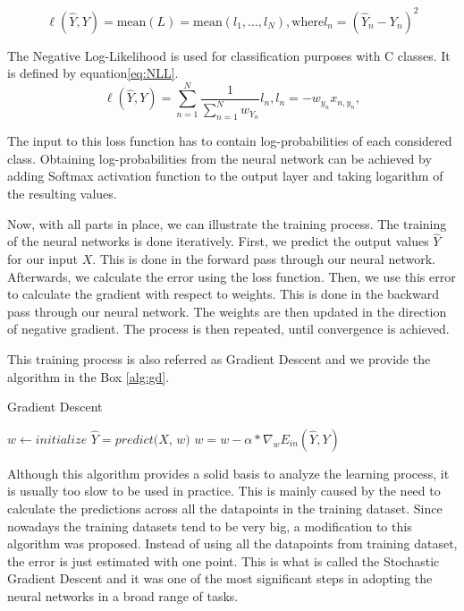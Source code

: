 \begin{equation}
    \ell(\hat{Y}, Y) = \text{mean}(L) = \text{mean}(l_1,\dots,l_N), 
    \text{where} l_n = (\hat{Y}_n - Y_n)^2
    \label{eq:MSE}
\end{equation}

The Negative Log-Likelihood is used for classification purposes with C classes.
It is defined by equation\ref{eq:NLL}.
\begin{equation}
    \ell(\hat{Y}, Y) = \sum_{n=1}^N \frac{1}{\sum_{n=1}^N w_{Y_n}} l_n,
    l_n = - w_{y_n} x_{n,y_n},
    \label{eq:NLL}
\end{equation}

The input to this loss function has to contain log-probabilities of each considered class.
Obtaining log-probabilities from the neural network can be achieved by adding Softmax activation function to the output layer and taking logarithm of the resulting values.

Now, with all parts in place, we can illustrate the training process.
The training of the neural networks is done iteratively.
First, we predict the output values $\hat{Y}$ for our input $X$.
This is done in the forward pass through our neural network.
Afterwards, we calculate the error using the loss function.
Then, we use this error to calculate the gradient with respect to weights.
This is done in the backward pass through our neural network.
The weights are then updated in the direction of negative gradient.
The process is then repeated, until convergence is achieved.

This training process is also referred as Gradient Descent and we provide the algorithm in the Box \ref{alg:gd}.

\begin{algorithm}
\caption{Gradient Descent}
\label{alg:gd}
\begin{algorithmic}[1]
\State $w \gets \textit{initialize}$
\Repeat
\State $\hat{Y} = \textit{predict(X, w)}$
\State $w = w - \alpha * \nabla_w E_{in}(\hat{Y}, Y)$
\end{algorithmic}
\end{algorithm}

Although this algorithm provides a solid basis to analyze the learning process, it is usually too slow to be used in practice.
This is mainly caused by the need to calculate the predictions across all the datapoints in the training dataset.
Since nowadays the training datasets tend to be very big, a modification to this algorithm was proposed.
Instead of using all the datapoints from training dataset, the error is just estimated with one point.
This is what is called the Stochastic Gradient Descent and it was one of the most significant steps in adopting the neural networks in a broad range of tasks.

